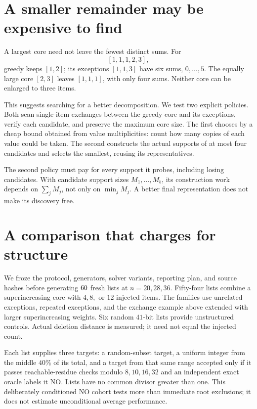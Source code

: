 \documentclass[10pt,english]{article}
\begin{document}
\section{A smaller remainder may be expensive to find}
A largest core need not leave the fewest distinct sums. For
\[
[1,1,1,2,3],
\]
greedy keeps \([1,2]\); its exceptions \([1,1,3]\) have six sums, \(0,\ldots,5\). The equally large core \([2,3]\) leaves \([1,1,1]\), with only four sums. Neither core can be enlarged to three items.

This suggests searching for a better decomposition. We test two explicit policies. Both scan single-item exchanges between the greedy core and its exceptions, verify each candidate, and preserve the maximum core size. The first chooses by a cheap bound obtained from value multiplicities: count how many copies of each value could be taken. The second constructs the actual supports of at most four candidates and selects the smallest, reusing its representatives.

The second policy must pay for every support it probes, including losing candidates. With candidate support sizes \(M_1,\ldots,M_b\), its construction work depends on \(\sum_j M_j\), not only on \(\min_j M_j\). A better final representation does not make its discovery free.

\section{A comparison that charges for structure}
We froze the protocol, generators, solver variants, reporting plan, and source hashes before generating \(60\) fresh lists at \(n=20,28,36\). Fifty-four lists combine a superincreasing core with \(4,8,\) or \(12\) injected items. The families use unrelated exceptions, repeated exceptions, and the exchange example above extended with larger superincreasing weights. Six random \(41\)-bit lists provide unstructured controls. Actual deletion distance is measured; it need not equal the injected count.

Each list supplies three targets: a random-subset target, a uniform integer from the middle \(40\%\) of its total, and a target from that same range accepted only if it passes reachable-residue checks modulo \(8,10,16,32\) and an independent exact oracle labels it NO. Lists have no common divisor greater than one. This deliberately conditioned NO cohort tests more than immediate root exclusions; it does not estimate unconditional average performance.
\end{document}
